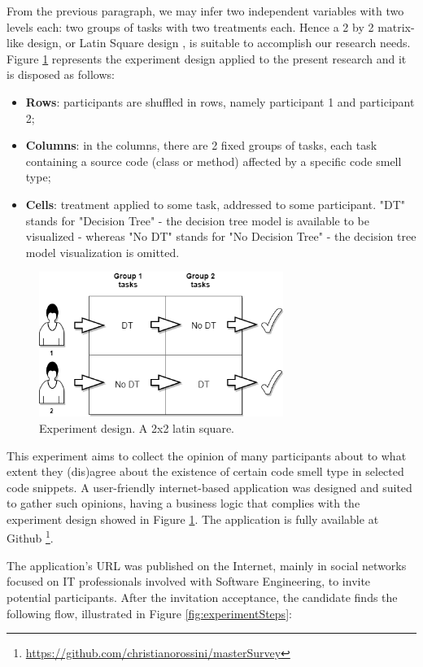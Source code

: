 From the previous paragraph, we may infer two independent variables with two levels each: two groups of tasks with two treatments each. Hence a 2 by 2 matrix-like design, or Latin Square design \cite{box2005statistics}, is suitable to accomplish our research needs. Figure \ref{fig:latinSquare} represents the experiment design applied to the present research and it is disposed as follows:
\begin{itemize}
    \item \textbf{Rows}: participants are shuffled in rows, namely participant 1 and participant 2;
    \item \textbf{Columns}: in the columns, there are 2 fixed groups of tasks, each task containing a source code (class or method) affected by a specific code smell type;
    \item \textbf{Cells}: treatment applied to some task, addressed to some participant. "DT" stands for "Decision Tree" - the decision tree model is available to be visualized - whereas "No DT" stands for "No Decision Tree" - the decision tree model visualization is omitted.
\end{itemize}

\begin{figure}[t]
\centering
\includegraphics[width=300px]{figures/Latim_square_desing.png}
\caption{Experiment design. A 2x2 latin square.}
\label{fig:latinSquare}
\end{figure}

This experiment aims to collect the opinion of many participants about to what extent they (dis)agree about the existence of certain code smell type in selected code snippets. A user-friendly internet-based application was designed and suited to gather such opinions, having a business logic that complies with the experiment design showed in Figure \ref{fig:latinSquare}. The application is fully available at Github \footnote{\hyperlink{https://github.com/christianorossini/masterSurvey}{https://github.com/christianorossini/masterSurvey}}.

The application's URL was published on the Internet, mainly in social networks focused on IT professionals involved with Software Engineering, to invite potential participants.  After the invitation acceptance, the candidate finds the following flow, illustrated in Figure \ref{fig:experimentSteps}:


